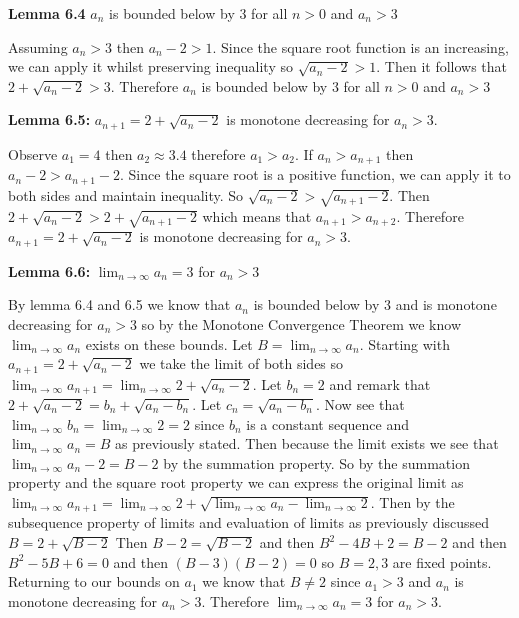 \documentclass[10pt,letterpaper]{article}
\newcommand\ds{\displaystyle}
\begin{document}
{\medskip

\textbf{Lemma 6.4} $a_n$ is bounded below by $3$ for all $n > 0$ and $a_n > 3$

Assuming $a_n > 3$ then $a_n - 2 > 1$. Since the square root function is an increasing, we can apply it whilst preserving inequality so $\sqrt{a_n - 2} > 1$. Then it follows that $2 + \sqrt{a_n - 2} > 3$. Therefore $a_n$ is bounded below by $3$ for all $n > 0$ and $a_n > 3$

\medskip

\textbf{Lemma 6.5:} $a_{n +1} = 2 + \sqrt{a_n - 2}$ is monotone decreasing for $a_n > 3$.

Observe $a_1 = 4$ then $a_2 \approx 3.4$ therefore $a_1 > a_2$. If $a_n > a_{n+1}$ then $a_n - 2 > a_{n+1} - 2$. Since the square root is a positive function, we can apply it to both sides and maintain inequality. So $\sqrt{a_n - 2} > \sqrt{a_{n+1} - 2}$. Then $2 + \sqrt{a_n - 2} > 2 + \sqrt{a_{n+1} - 2}$ which means that $a_{n+1} > a_{n+2}$. Therefore $a_{n +1} = 2 + \sqrt{a_n - 2}$ is monotone decreasing for $a_n > 3$.

\medskip

\textbf{Lemma 6.6:} $\ds \lim_{n\to\infty}a_n = 3$ for $a_n > 3$

By lemma 6.4 and 6.5 we know that $a_n$ is bounded below by $3$ and is monotone decreasing for $a_n > 3$ so by the Monotone Convergence Theorem we know $\ds \lim_{n\to\infty}a_n$ exists on these bounds.
Let $B = \ds \lim_{n\to\infty} a_n$.
Starting with $a_{n+1} = 2 + \sqrt{a_n - 2}$ we take the limit of both sides so $\ds\lim_{n\to\infty}a_{n+1} = \ds\lim_{n\to\infty} 2 + \sqrt{a_n - 2}$.
Let $b_n = 2$ and remark that $2 + \sqrt{a_n - 2} = b_n + \sqrt{a_n - b_n}$.
Let $c_n = \sqrt{a_n - b_n}$.
Now see that $\ds\lim_{n\to\infty} b_n = \ds\lim_{n\to\infty} 2 = 2$ since $b_n$ is a constant sequence and $\ds\lim_{n\to\infty} a_n = B$ as previously stated.
Then because the limit exists we see that $\ds\lim_{n\to\infty} a_n - 2 = B - 2$ by the summation property.
So by the summation property and the square root property we can express the original limit as $\ds\lim_{n\to\infty} a_{n+1} = \ds\lim_{n\to\infty} 2 + \sqrt{\ds\lim_{n\to\infty}a_n - \ds\lim_{n\to\infty}2}$.
Then by the subsequence property of limits and evaluation of limits as previously discussed $B = 2 + \sqrt{B - 2}$
Then $B - 2 = \sqrt{B - 2}$ and then $B^2 - 4B + 2 = B - 2$ and then $B^2 - 5B + 6 = 0$ and then $(B - 3)(B - 2) = 0$ so $B = 2,3$ are fixed points. Returning to our bounds on $a_1$ we know that $B \neq 2$ since $a_1 > 3$ and $a_n$ is monotone decreasing for $a_n > 3$. Therefore $\ds \lim_{n\to\infty}a_n = 3$ for $a_n > 3$.

}
\end{document}
